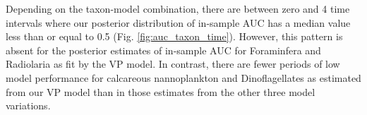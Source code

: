 \documentclass[12pt,letterpaper]{article}
\begin{document}
\begin{refsection}


Depending on the taxon-model combination, there are between zero and 4 time intervals where our posterior distribution of in-sample AUC has a median value less than or equal to 0.5 (Fig. \ref{fig:auc_taxon_time}). However, this pattern is absent for the posterior estimates of in-sample AUC for Foraminfera and Radiolaria as fit by the VP model. In contrast, there are fewer periods of low model performance for calcareous nannoplankton and Dinoflagellates as estimated from our VP model than in those estimates from the other three model variations.


\end{refsection}
\end{document}
